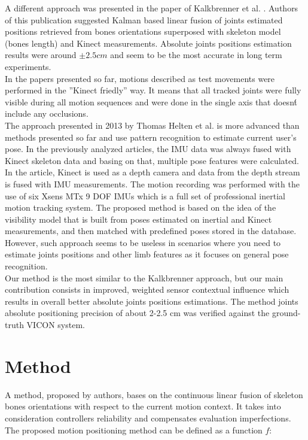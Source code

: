 \documentclass[9pt]{llncs}
\begin{document}
A different approach was presented in the paper of Kalkbrenner et al. \cite{Kalkbrenner2014}. Authors of this publication suggested Kalman based linear fusion of joints estimated positions retrieved from bones orientations superposed with skeleton model (bones length) and Kinect measurements. Absolute joints positions estimation results were around $\pm 2.5cm$ and seem to be the most accurate in long term experiments.\\
In the papers presented so far, motions described as test movements were performed in the ''Kinect friedly'' way. It means that all tracked joints were fully visible during all motion sequences and were done in the single axis that doesn\'t include any occlusions.\\
The approach presented in 2013 by Thomas Helten et al. \cite{Helten2013} is more advanced than methods presented so far and use pattern recognition to estimate current user's pose. In the previously analyzed articles, the IMU data was always fused with Kinect skeleton data and basing on that, multiple pose features were calculated. In the article, Kinect is used as a depth camera and data from the depth stream is fused with IMU measurements. The motion recording was performed with the use of six Xsens MTx 9 DOF IMUs \cite{XSense2015} which is a full set of professional inertial motion tracking system. The proposed method is based on the idea of the visibility model that is built from poses estimated on inertial and Kinect measurements, and then matched with predefined poses stored in the database. However, such approach seems to be useless in scenarios where you need to estimate joints positions and other limb features as it focuses on general pose recognition.\\
Our method is the most similar to the Kalkbrenner approach, but our main contribution consists in improved, weighted sensor contextual influence which results in overall better absolute joints positions estimations. The method joints absolute positioning precision of about 2-2.5 cm was verified against the ground-truth VICON system.


\section{Method}
A method, proposed by authors, bases on the continuous linear fusion of skeleton bones orientations with respect to the current motion context. It takes into consideration controllers reliability and compensates evaluation imperfections. The proposed motion positioning method can be defined as a function $f$:
\end{document}
